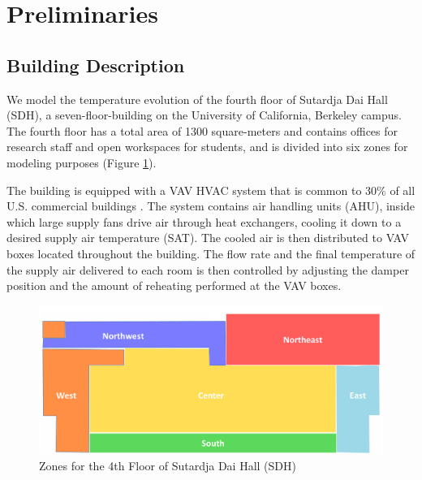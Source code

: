 
\section{Preliminaries}
\label{sec:Preliminaries}

\subsection{Building Description}\label{sec:testbed}
We model the temperature evolution of the fourth floor of Sutardja Dai Hall (SDH), a seven-floor-building on the University of California, Berkeley campus. 
The fourth floor has a total area of 1300 square-meters and contains offices for research staff and open workspaces for students, and is divided into six zones for modeling purposes (Figure \ref{fig:floor_plan}).

The building is equipped with a VAV HVAC system that is common to 30\% of all U.S. commercial buildings \cite{VAV}. 
The system contains air handling units (AHU), inside which large supply fans drive air through heat exchangers, cooling it down to a desired supply air temperature (SAT). The cooled air is then distributed to VAV boxes located throughout the building. The flow rate and the final temperature of the supply air delivered to each room is then controlled by adjusting the damper position and the amount of reheating performed at the VAV boxes. 

\begin{figure}[hbtp]
\centering
\vspace*{0.5cm}
\includegraphics[width=\textwidth]{chapters/building_model/figures/FloorPlan.png}
\vspace*{-0.05cm}
\caption{Zones for the 4th Floor of Sutardja Dai Hall (SDH)}
\label{fig:floor_plan}
\vspace*{-0.45cm}
\end{figure}

